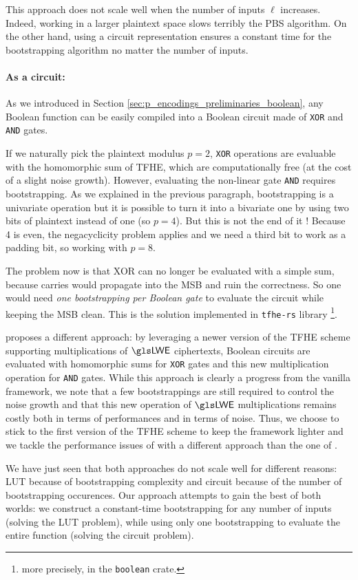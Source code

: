 This approach does not scale well when the number of inputs $\ell$ increases. Indeed, working in a larger plaintext space slows terribly the \gls{PBS} algorithm. On the other hand, using a circuit representation ensures a constant time for the bootstrapping algorithm no matter the number of inputs. 


\paragraph{As a circuit:}

As we introduced in Section \ref{sec:p_encodings_preliminaries_boolean}, any Boolean function can be easily compiled into a Boolean circuit made of \texttt{XOR} and \texttt{AND} gates. 

If we naturally pick the plaintext modulus $p=2$, \texttt{XOR} operations are evaluable with the homomorphic sum of \gls{TFHE}, which are computationally free (at the cost of a slight noise growth). However, evaluating the non-linear gate \texttt{AND} requires bootstrapping. As we explained in the previous paragraph, bootstrapping is a univariate operation but it is possible to turn it into a bivariate one by using two bits of plaintext instead of one (so $p=4$). But this is not the end of it ! Because 4 is even, the negacyclicity problem applies and we need a third bit to work as a padding bit, so working with $p=8$.

The problem now is that XOR can no longer be evaluated with a simple sum, because carries would propagate into the \gls{MSB} and ruin the correctness. So one would need \textit{one bootstrapping per Boolean gate} to evaluate the circuit while keeping the \gls{MSB} clean. This is the solution implemented in \texttt{tfhe-rs} library \cite{tfhe-rs}\footnote{more precisely, in the \texttt{boolean} crate.}. 


\cite{AC:CLOT21} proposes a different approach: by leveraging a newer version of the \gls{TFHE} scheme supporting multiplications of $\LWE$ ciphertexts, Boolean circuits are evaluated with homomorphic sums for \texttt{XOR} gates and this new multiplication operation for \texttt{AND} gates. While this approach is clearly a progress from the vanilla framework, we note that a few bootstrappings are still required to control the noise growth and that this new operation of $\LWE$ multiplications remains costly both in terms of performances and in terms of noise. Thus, we choose to stick to the first version of the \gls{TFHE} scheme to keep the framework lighter and we tackle the performance issues of \cite{JC:CGGI20} with a different approach than the one of \cite{AC:CLOT21}.

\bigskip

We have just seen that both approaches do not scale well for different reasons: \gls{LUT} because of bootstrapping complexity and circuit because of the number of bootstrapping occurences. Our approach attempts to gain the best of both worlds: we construct a constant-time bootstrapping for any number of inputs (solving the \gls{LUT} problem), while using only one bootstrapping to evaluate the entire function (solving the circuit problem).


